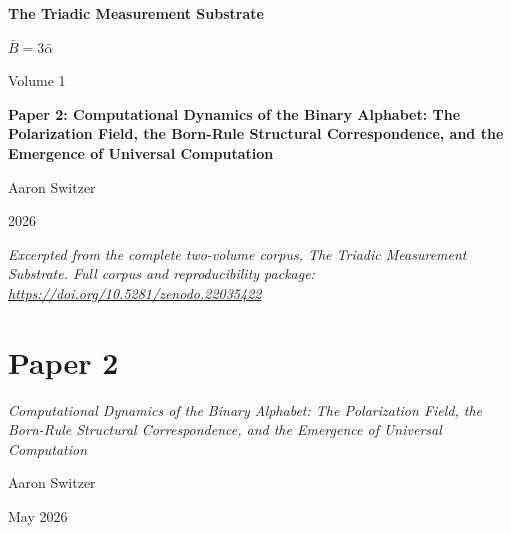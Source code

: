 \documentclass[11pt,oneside]{report}
\theoremstyle{definition}
\theoremstyle{remark}
\begin{document}
\thispagestyle{empty}
\begin{titlepage}
\centering
\vspace*{2cm}
{\sffamily\bfseries\Large The Triadic Measurement Substrate\par}
\vspace{0.6cm}
{\large $\bar{B} = 3\bar{\alpha}$\par}
\vspace{1cm}
{\sffamily\large Volume 1\par}
\vspace{1.4cm}
{\Large \bfseries Paper 2: Computational Dynamics of the Binary Alphabet: The Polarization Field, the Born-Rule Structural Correspondence, and the Emergence of Universal Computation\par}
\vfill
{\large Aaron Switzer\par}
\vspace{0.4cm}
{\large 2026\par}
\vspace{1.2cm}
{\small\itshape Excerpted from the complete two-volume corpus, \emph{The Triadic Measurement Substrate}. Full corpus and reproducibility package: \url{https://doi.org/10.5281/zenodo.22035422}\par}
\end{titlepage}
\cleardoublepage
{}

\chapter*{Paper 2}
\begingroup\centering
{\large\itshape Computational Dynamics of the Binary Alphabet: The Polarization Field, the Born-Rule Structural Correspondence, and the Emergence of Universal Computation\par}\vspace{0.8em}
{\normalsize Aaron Switzer\par}
{\small May 2026\par}
\endgroup\vspace{1.0em}

\par\vspace{0.6em}
\end{document}
